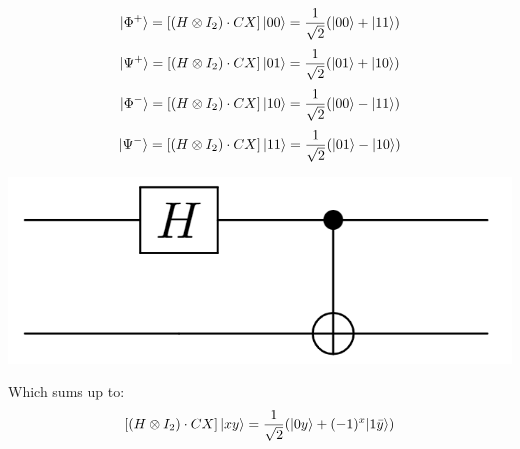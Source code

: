 \documentclass[a4paper,10pt]{scrartcl}
\begin{document}
\begin{minipage}{\linewidth}
\begin{minipage}{0.5\linewidth}\center
\[|\Phi^+\rangle  = [(H\otimes I_2) \cdot CX] \ket{00} = \frac{1}{\sqrt{2}} (|00\rangle+ |11\rangle)\]
\[|\Psi^+\rangle  = [(H\otimes I_2) \cdot CX] \ket{01} = \frac{1}{\sqrt{2}} (|01\rangle+ |10\rangle)\]
\[|\Phi^-\rangle  = [(H\otimes I_2) \cdot CX] \ket{10} =  \frac{1}{\sqrt{2}} (|00\rangle- |11\rangle) \]
\[|\Psi^-\rangle  = [(H\otimes I_2) \cdot CX] \ket{11} = \frac{1}{\sqrt{2}} (|01\rangle- |10\rangle)\]
\end{minipage}
\begin{minipage}{0.5\linewidth}\center
\vspace*{\fill}
\includegraphics[scale=0.1]{img/h_cnot.png}
\vspace*{\fill}
\end{minipage}
\end{minipage}

\vspace{2\baselineskip}
Which sums up to:
	\[[(H\otimes I_2) \cdot CX] \ket{xy}  = \frac{1}{\sqrt{2}} (|0y\rangle + (-1)^{x} |1 \bar{y}\rangle) \]
	
\end{document}
